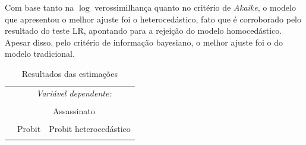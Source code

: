 \documentclass[12pt,
               openright,
               oneside,
               a4paper,
							 section=TITLE,     %
               subsection=Title,  %
               english,brazil]{article}
\begin{document}
Com base tanto na $\log$ verossimilhança quanto no critério de \textit{Akaike}, o modelo que apresentou o melhor ajuste foi o heterocedástico, fato que é corroborado pelo resultado do teste LR, apontando para a rejeição do modelo homocedástico. Apesar disso, pelo critério de informação bayesiano, o melhor ajuste foi o do modelo tradicional.

\begin{table}[H] \centering 
  \caption{Resultados das estimações} 
  \label{tab:resultados} 
\begin{tabular}{lcc} 
\\
 & \multicolumn{2}{c}{\textit{Variável dependente:}} \\ 
\cline{2-3} 
\\& \multicolumn{2}{c}{Assassinato} \\ \cline{2-3} \\ & Probit & Probit heterocedástico \\
\midrule \\


\end{tabular}
\end{table}
\end{document}
